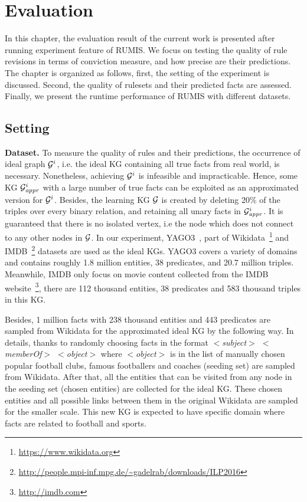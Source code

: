\chapter{Evaluation}
\label{chap:eval}

In this chapter, the evaluation result of the current work is presented after running experiment feature of RUMIS. We focus on testing the quality of rule revisions in terms of conviction measure, and how precise are their predictions. The chapter is organized as follows, first, the setting of the experiment is discussed. Second, the quality of rulesets and their predicted facts are assessed. Finally, we present the runtime performance of RUMIS with different datasets.

\section{Setting}

\textbf{Dataset.} To measure the quality of rules and their predictions, the occurrence of ideal graph $\mathcal{G}^i$, i.e. the ideal KG containing all true facts from real world, is necessary. Nonetheless, achieving $\mathcal{G}^i$ is infeasible and impracticable. Hence, some KG $\mathcal{G}^i_{\mathit{appr}}$ with a large number of true facts can be exploited as an approximated version for $\mathcal{G}^i$. Besides, the learning KG $\mathcal{G}$ is created by deleting 20\% of the triples over every binary relation, and retaining all unary facts in $\mathcal{G}^i_{\mathit{appr}}$. It is guaranteed that there is no isolated vertex, i.e the node which does not connect to any other nodes in $\mathcal{G}$. In our experiment, YAGO3~\cite{ref28}, part of Wikidata~\footnote{\url{https://www.wikidata.org}} and IMDB~\footnote{\url{http://people.mpi-inf.mpg.de/~gadelrab/downloads/ILP2016}} datasets are used as the ideal KGs. YAGO3 covers a variety of domains and contains roughly 1.8 million entities, 38 predicates, and 20.7 million triples. Meanwhile, IMDB only focus on movie content collected from the IMDB website~\footnote{\url{http://imdb.com}}, there are 112 thousand entities, 38 predicates and 583 thousand triples in this KG.

Besides, 1 million facts with 238 thousand entities and 443 predicates are sampled from Wikidata for the approximated ideal KG by the following way. In details, thanks to randomly choosing facts in the format \textit{$<$subject$>$ $<$memberOf$>$ $<$object$>$} where \textit{$<$object$>$} is in the list of manually chosen popular football clubs, famous footballers and coaches (seeding set) are sampled from Wikidata. After that, all the entities that can be visited from any node in the seeding set (chosen entities) are collected for the ideal KG. These chosen entities and all possible links between them in the original Wikidata are sampled for the smaller scale. This new KG is expected to have specific domain where facts are related to football and sports.

